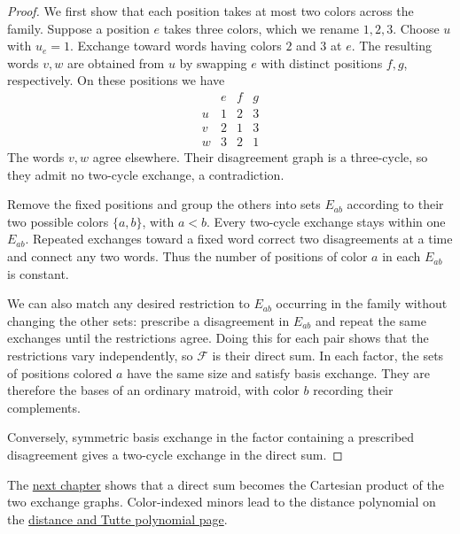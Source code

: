 \begin{proof}
We first show that each position takes at most two colors across the family.
Suppose a position $e$ takes three colors, which we rename $1,2,3$.
Choose $u$ with $u_e=1$. Exchange toward words having colors $2$ and $3$
at $e$. The resulting words $v,w$ are obtained from $u$ by swapping $e$
with distinct positions $f,g$, respectively. On these positions we have
\[
\begin{array}{c|ccc}
 &e&f&g\\ \hline
u&1&2&3\\
v&2&1&3\\
w&3&2&1
\end{array}
\]
The words $v,w$ agree elsewhere. Their disagreement graph is a three-cycle,
so they admit no two-cycle exchange, a contradiction.

Remove the fixed positions and group the others into sets $E_{ab}$
according to their two possible colors $\{a,b\}$, with $a<b$.
Every two-cycle exchange stays within one $E_{ab}$. Repeated exchanges
toward a fixed word correct two disagreements at a time and connect any
two words. Thus the number of positions of color $a$ in each $E_{ab}$
is constant.

We can also match any desired restriction to $E_{ab}$ occurring in the
family without changing the other sets: prescribe a disagreement in
$E_{ab}$ and repeat the same exchanges until the restrictions agree.
Doing this for each pair shows that the restrictions vary independently,
so $\mathcal F$ is their direct sum. In each factor, the sets of positions
colored $a$ have the same size and satisfy basis exchange. They are
therefore the bases of an ordinary matroid, with color $b$ recording
their complements.

Conversely, symmetric basis exchange in the factor containing a prescribed
disagreement gives a two-cycle exchange in the direct sum.
\end{proof}

The \href{exchange-graphs.htm}{next chapter} shows that a direct sum becomes
the Cartesian product of the two exchange graphs. Color-indexed minors lead to
the distance polynomial on the \href{tutte.htm}{distance and Tutte polynomial
page}.
